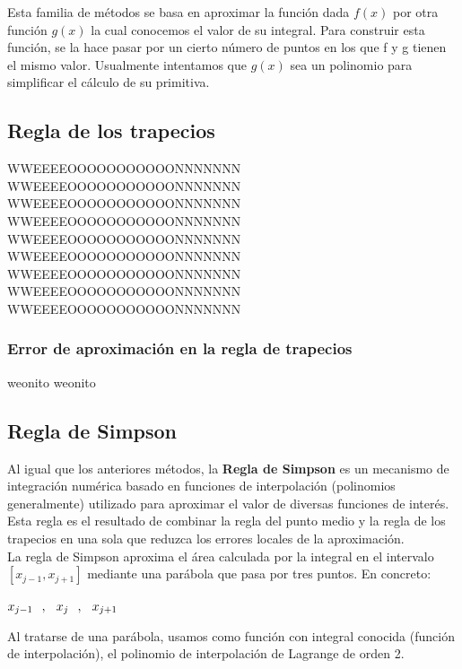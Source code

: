 \documentclass[12pt]{article}
\begin{document}
Esta familia de métodos se basa en aproximar la función dada $f(x)$ por otra función $g(x)$ la cual conocemos el valor de su integral. Para  construir esta función, se la hace pasar por un cierto número de puntos en los que f y g tienen el mismo valor. Usualmente intentamos que $g(x)$ sea un polinomio para simplificar el cálculo de su primitiva.
\subsection{Regla de los trapecios}

WWEEEEOOOOOOOOOOONNNNNNN  	WWEEEEOOOOOOOOOOONNNNNNN  	WWEEEEOOOOOOOOOOONNNNNNN  	WWEEEEOOOOOOOOOOONNNNNNN  	WWEEEEOOOOOOOOOOONNNNNNN  	WWEEEEOOOOOOOOOOONNNNNNN  	WWEEEEOOOOOOOOOOONNNNNNN  	WWEEEEOOOOOOOOOOONNNNNNN  	WWEEEEOOOOOOOOOOONNNNNNN  

\subsubsection{Error de aproximación en la regla de trapecios}

weonito weonito

\subsection{Regla de Simpson}

Al igual que los anteriores métodos, la \textbf{Regla de Simpson} es un mecanismo de integración numérica basado en funciones de interpolación (polinomios generalmente) utilizado para aproximar el valor de diversas funciones de interés. Esta regla es el resultado de combinar la regla del punto medio y la regla de los trapecios en una sola que reduzca los errores locales de la aproximación.\\

La regla de Simpson aproxima el área calculada por la integral en el intervalo $[x_{j-1} , x_{j+1}]$ mediante una parábola que pasa por tres puntos. En concreto:

\begin{center}
$x_{j-1} \hspace{2.5mm},\hspace{2.5mm} x_{j} \hspace{2.5mm},\hspace{2.5mm} x_{j+1}$
\end{center}

Al tratarse de una parábola, usamos como función con integral conocida (función de interpolación), el polinomio de interpolación de Lagrange de orden 2.\\
\end{document}
